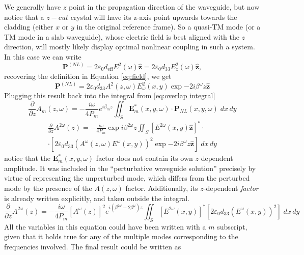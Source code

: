 We generally have $z$ point in the propagation direction of the waveguide, but now notice that a $z-cut$ crystal will have its z-axis point upwards towards the cladding (either $x$ or $y$ in the original reference frame). So a quasi-TM mode (or a TM mode in a slab waveguide), whose electric field is best aligned with the $z$ direction, will mostly likely display optimal nonlinear coupling in such a system. In this case we can write
\begin{equation}
    \textbf{P}^{(NL)}=2\varepsilon_0d_{\text{eff}}E^2(\omega)\hat{\textbf{z}}=2\varepsilon_0d_{33}E^2_z(\omega)\hat{\textbf{z}},
\end{equation}
recovering the definition in Equation \ref{eq:field}, we get
\begin{equation}
    \textbf{P}^{(NL)}=2\varepsilon_0 d_{33}A^2(z,\omega)E^2_\omega(x,y)\exp{-2i\beta^\omega z}\hat{\textbf{z}}
\end{equation}
Plugging this result back into the integral from \ref{eq:overlap integral}
\begin{equation}
    \frac{\partial}{\partial z} A_m(z,\omega)=-\frac{i\omega}{4P_m}e^{i\beta_mz}\iint_S\textbf{E}_{m}^*(x,y,\omega)\cdot\textbf{P}_{NL}(x,y,\omega)\;dx\,dy
\end{equation}
\begin{multline}
    \frac{\partial}{\partial z} A^{2\omega}(z)=-\frac{i\omega}{4P_m}\exp{i\beta^{2\omega} z}\iint_S\left[E^{2\omega}(x,y)\hat{\textbf{z}}\right]^*\cdot\\\cdot\left[2\varepsilon_0 d_{33}\left(A^{\omega}(z,\omega)E^\omega(x,y)\right)^2\exp{-2i\beta^\omega z}\hat{\textbf{z}}\right]\;dx\,dy
\end{multline}
notice that the $\textbf{E}^*_m(x,y,\omega)$ factor does not contain its own $z$ dependent amplitude. It was included in the ``perturbative waveguide solution'' precisely by virtue of representing the unperturbed mode, which differs from the perturbed mode by the presence of the $A(z,\omega)$ factor. Additionally, its $z$-dependent \textit{factor} is already written explicitly, and taken outside the integral.
\begin{equation}
    \frac{\partial}{\partial z} A^{2\omega}(z)=-\frac{i\omega}{4P_m}\left[A^{\omega}(z)\right]^2e^{i(\beta^{2\omega}-2\beta^{\omega}) z}\iint_S\left[E^{2\omega}(x,y)\right]^*\left[2\varepsilon_0 d_{33}\left(E^\omega(x,y)\right)^2\right]\;dx\,dy
\end{equation}
All the variables in this equation could have been written with a $m$ subscript, given that it holds true for any of the multiple modes corresponding to the frequencies involved. The final result could be written as
